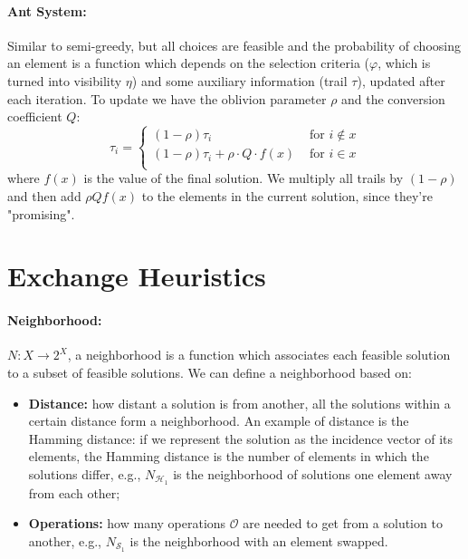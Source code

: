 \documentclass{article}
\begin{document}
	\paragraph{Ant System:} Similar to semi-greedy, but all choices are feasible and the probability of choosing an element is a function which depends on the selection criteria ($\varphi$, which is turned into visibility $\eta$) and some auxiliary information (trail $\tau$), updated after each iteration. To update we have the oblivion parameter $\rho$ and the conversion coefficient $Q$: 
	$$ 
	\tau_i = \begin{cases}
		(1 - \rho) \tau_i & \text{ for } i \notin x \\
		(1 - \rho) \tau_i + \rho \cdot Q \cdot f(x) & \text{ for } i \in x \\
	\end{cases}
	$$
	where $f(x)$ is the value of the final solution. We multiply all trails by $(1-\rho)$ and then add $\rho Q f(x)$ to the elements in the current solution, since they're "promising".\\
	
	\section*{Exchange Heuristics}
	
	\paragraph{Neighborhood:} $N: X \rightarrow 2^X$, a neighborhood is a function which associates each feasible solution to a subset of feasible solutions. We can define a neighborhood based on: 
	\begin{itemize}
		\item \textbf{Distance:} how distant a solution is from another, all the solutions within a certain distance form a neighborhood. An example of distance is the Hamming distance: if we represent the solution as the incidence vector of its elements, the Hamming distance is the number of elements in which the solutions differ, e.g., $N_{\mathcal{H}_1}$ is the neighborhood of solutions one element away from each other; 
		\item \textbf{Operations:} how many operations $\mathcal{O}$ are needed to get from a solution to another, e.g., $N_{\mathcal{S}_1}$ is the neighborhood with an element swapped. \\
	\end{itemize}
	
\end{document}
